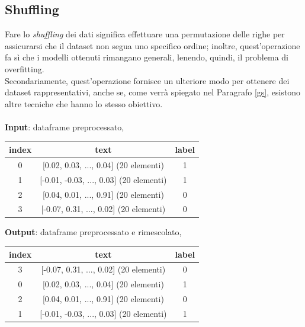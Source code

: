 \documentclass[12pt]{report}
\theoremstyle{definition}
\begin{document}
\subsection{Shuffling}
Fare lo \textit{shuffling} dei dati significa effettuare una permutazione delle righe per assicurarsi che il dataset non segua uno specifico ordine; inoltre, quest'operazione fa sì che i modelli ottenuti rimangano generali, lenendo, quindi, il problema di overfitting.
\\
Secondariamente, quest'operazione fornisce un ulteriore modo per ottenere dei dataset rappresentativi, anche se, come verrà spiegato nel Paragrafo \ref{gs}, esistono altre tecniche che hanno lo stesso obiettivo. 
\\
\\
\textbf{Input}: dataframe preprocessato,
\begin{center}
    \begin{tabular}{|c|c|c|}
    \hline
    \textbf{index} & \textbf{text} & \textbf{label} \\
    \hline
         0 & [0.02, 0.03, ..., 0.04] (20 elementi) & 1 \\
         1 & [-0.01, -0.03, ..., 0.03] (20 elementi) & 1 \\
         2 & [0.04, 0.01, ..., 0.91] (20 elementi) & 0 \\
         3 & [-0.07, 0.31, ..., 0.02] (20 elementi) & 0 \\
    \hline
    \end{tabular}
\end{center}
\textbf{Output}: dataframe preprocessato e rimescolato,
\begin{center}
    \begin{tabular}{|c|c|c|}
    \hline
    \textbf{index} & \textbf{text} & \textbf{label} \\
    \hline
        3 & [-0.07, 0.31, ..., 0.02] (20 elementi) & 0 \\
        0 & [0.02, 0.03, ..., 0.04] (20 elementi) & 1 \\
        2 & [0.04, 0.01, ..., 0.91] (20 elementi) & 0 \\
        1 & [-0.01, -0.03, ..., 0.03] (20 elementi) & 1 \\
    \hline
    \end{tabular}
\end{center}

\end{document}
